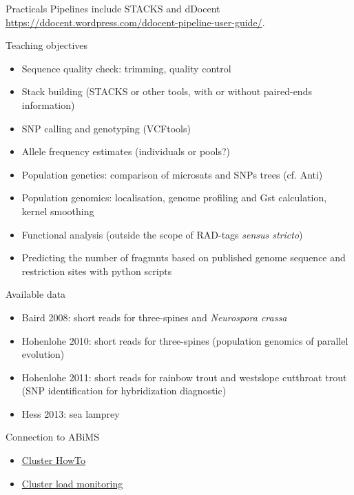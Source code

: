 \documentclass[presentation]{beamer}
\begin{document}
\begin{frame}[label=sec-2]{Practicals}
Pipelines include STACKS and dDocent
\url{https://ddocent.wordpress.com/ddocent-pipeline-user-guide/}.

\begin{block}{Teaching objectives}
\begin{itemize}
\item Sequence quality check: trimming, quality control
\item Stack building (STACKS or other tools, with or without paired-ends
information)
\item SNP calling and genotyping (VCFtools)
\item Allele frequency estimates (individuals or pools?)
\item Population genetics: comparison of microsats and SNPs trees (cf. Anti)
\item Population genomics: localisation, genome profiling and Gst calculation,
kernel smoothing
\item Functional analysis (outside the scope of RAD-tags \emph{sensus stricto})
\item Predicting the number of fragmnts based on published genome sequence and
restriction sites with python scripts
\end{itemize}
\end{block}
\begin{block}{Available data}
\begin{itemize}
\item Baird 2008: short reads for three-spines and \emph{Neurospora crassa}
\item Hohenlohe 2010: short reads for three-spines (population genomics of parallel
evolution)
\item Hohenlohe 2011: short reads for rainbow trout and westslope cutthroat trout
(SNP identification for hybridization diagnostic)
\item Hess 2013: sea lamprey
\end{itemize}
\end{block}
\begin{block}{Connection to ABiMS}
\begin{itemize}
\item \href{http://abims.sb-roscoff.fr/resources/cluster/howto}{Cluster HowTo}
\item \href{http://application.sb-roscoff.fr/ganglia/}{Cluster load monitoring}
\end{itemize}
\end{block}
\end{frame}
\end{document}

